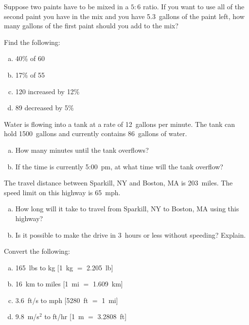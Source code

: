 \documentclass[11pt,letterpaper]{article}
\begin{document}
\newpage



 Suppose two paints have to be mixed in a $5 : 6$ ratio. If you want to use all of the second paint you have in the mix and you have 5.3~gallons of the paint left, how many gallons of the first paint should you add to the mix? 



\vspace{5cm}



 Find the following:
\begin{enumerate}[(a)]
\item 40\% of 60 \pvspace{1cm}
\item 17\% of 55 \pvspace{1cm}
\item 120 increased by 12\% \pvspace{1cm}
\item 89 decreased by 5\% \pvspace{1cm}
\end{enumerate} \pspace


 Water is flowing into a tank at a rate of 12~gallons per minute. The tank can hold 1500~gallons and currently contains 86~gallons of water. 
\begin{enumerate}[(a)]
\item How many minutes until the tank overflows? \vfill
\item If the time is currently 5:00~pm, at what time will the tank overflow? \vfill
\end{enumerate}



\newpage



 The travel distance between Sparkill, NY and Boston, MA is 203~miles. The speed limit on this highway is 65~mph. 
\begin{enumerate}[(a)]
\item How long will it take to travel from Sparkill, NY to Boston, MA using this highway? \pvspace{3cm}
\item Is it possible to make the drive in 3~hours or less without speeding? Explain. \pvspace{3cm}
\end{enumerate}


 Convert the following:
\begin{enumerate}[(a)]
\item 165~lbs to kg [1~kg $=$ 2.205~lb] \vfill
\item 16~km to miles [1~mi $=$ 1.609~km] \vfill
\item 3.6~ft/s to mph [5280~ft $=$ 1~mi] \vfill
\item 9.8~m/s$^2$ to ft/hr [1~m $=$ 3.2808~ft] \vfill
\end{enumerate}
\end{document}
